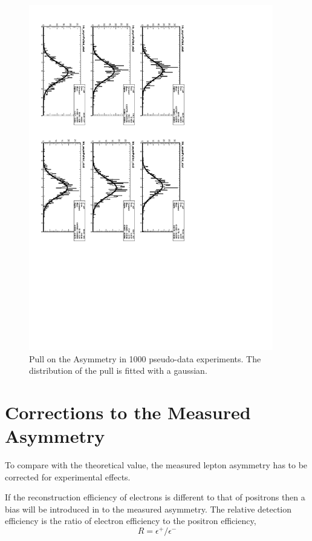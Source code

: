 \begin{figure}[htbp]
  \begin{center}
\includegraphics*[angle=90,width=0.95\textwidth]{pullasyTot.pdf}
    \caption{\label{fig:toyasym_pull}Pull on the Asymmetry in 1000 pseudo-data experiments. The distribution of the pull is fitted with a gaussian.}
  \end{center}
\end{figure}

\section{Corrections to the Measured Asymmetry}

To compare with the theoretical value, the measured lepton asymmetry has to be
corrected for experimental effects.

If the reconstruction efficiency of electrons is different to that of positrons
then a bias will be introduced in to the measured asymmetry.
The relative detection efficiency is the ratio of electron efficiency to the
positron efficiency,
\begin{equation}
 R = \epsilon^+/\epsilon^-
\end{equation}

